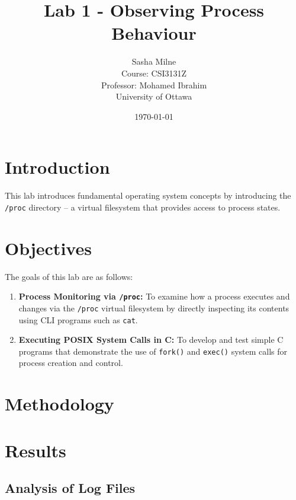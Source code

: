 \documentclass[12pt]{article}
\title{Lab 1 - Observing Process Behaviour}
\author{
    Sasha Milne \\
    Course: CSI3131Z \\
    Professor: Mohamed Ibrahim \\
    University of Ottawa
}
\date{\today}
\begin{document}
\maketitle


\section{Introduction}\label{sec:introduction}

This lab introduces fundamental operating system concepts by introducing the
\texttt{/proc} directory --
a virtual filesystem that provides access to process states.


\section{Objectives}\label{sec:objectives}

The goals of this lab are as follows:

\begin{enumerate}
    \item \textbf{Process Monitoring via \texttt{/proc}:}
    To examine how a process executes and changes via the \texttt{/proc}
    virtual filesystem by directly inspecting its contents using CLI programs
    such as \texttt{cat}.
    \item \textbf{Executing POSIX System Calls in C:}
    To develop and test simple C programs that demonstrate the use of
    \texttt{fork()} and \texttt{exec()} system calls for process creation and control.
\end{enumerate}

\section{Methodology}\label{sec:methodology}


\section{Results}\label{sec:results}
\subsection{Analysis of Log Files}\label{subsec:analysis-of-log-files}
\end{document}
